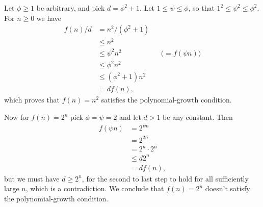 Let $\phi\ge1$ be arbitrary, and pick $d=\phi^2+1$.
Let $1\le\psi\le\phi$, so that $1^2\le\psi^2\le\phi^2$.
For $n\ge0$ we have
\begin{align*}
    f(n)/d &= n^2/(\phi^2+1) \\
    &\le n^2 \\
    &\le \psi^2n^2 && \text{($=f(\psi n)$)} \\
    &\le \phi^2n^2 \\
    &\le (\phi^2+1)n^2 \\
    &= df(n),
\end{align*}
which proves that $f(n)=n^2$ satisfies the polynomial-growth condition.

Now for $f(n)=2^n$ pick $\phi=\psi=2$ and let $d>1$ be any constant.
Then
\begin{align*}
    f(\psi n) &= 2^{\psi n} \\
    &= 2^{2n} \\
    &= 2^n\cdot2^n \\
    &\le d2^n \\
    &= df(n),
\end{align*}
but we must have $d\ge2^n$, for the second to last step to hold for all sufficiently large $n$, which is a contradiction.
We conclude that $f(n)=2^n$ doesn't satisfy the polynomial-growth condition.
